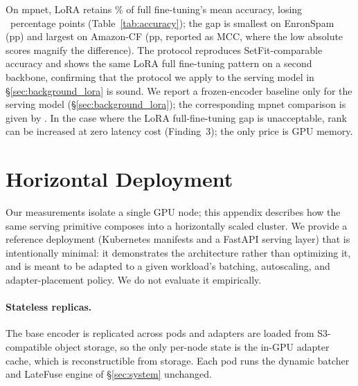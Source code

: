 \documentclass[11pt]{article}
\newcommand{\sysname}{LateFuse}
\begin{document}
On mpnet, LoRA retains \SetfitRetainsPct\% of full fine-tuning's mean accuracy,
losing \SetfitMeanDropPP{}~percentage points (Table~\ref{tab:accuracy}); the
gap is smallest on EnronSpam (\SetfitMinDropPP pp) and largest on Amazon-CF
(\SetfitMaxDropPP pp, reported as MCC, where the low absolute scores magnify
the difference). The protocol reproduces SetFit-comparable accuracy and shows
the same LoRA full fine-tuning pattern on a second backbone, confirming that
the protocol we apply to the serving model in \S\ref{sec:background_lora} is
sound. We report a frozen-encoder baseline only
for the serving model (\S\ref{sec:background_lora}); the corresponding mpnet
comparison is given by \citet{tunstall2022efficient}. In the case where the
LoRA full-fine-tuning gap is unacceptable, rank can be increased at zero
latency cost (Finding~3); the only price is GPU memory.

\begin{table}[h]
  \centering
  \small
  \caption{Per-task accuracy of LoRA adapters versus full encoder fine-tuning
    on \texttt{paraphrase-mpnet-base-v2}, the standard SetFit backbone
    ($N{=}8$ examples per class, rank=8, mean over 10 seeds). Scores are
  accuracy except Amazon-CF (MCC); $\Delta$ is LoRA minus Full~FT.}
  \label{tab:accuracy}
  
\end{table}

\section{Horizontal Deployment}
\label{sec:deployment}

Our measurements isolate a single GPU node; this appendix describes how the
same serving primitive composes into a horizontally scaled cluster. We provide
a reference deployment (Kubernetes manifests and a FastAPI serving layer) that
is intentionally minimal: it demonstrates the architecture rather than
optimizing it, and is meant to be adapted to a given workload's batching,
autoscaling, and adapter-placement policy. We do not evaluate it empirically.

\paragraph{Stateless replicas.}
The base encoder is replicated across pods and adapters are loaded from
S3-compatible object storage, so the only per-node state is the in-GPU adapter
cache, which is reconstructible from storage. Each pod runs the dynamic batcher
and \sysname{} engine of \S\ref{sec:system} unchanged.
\end{document}
